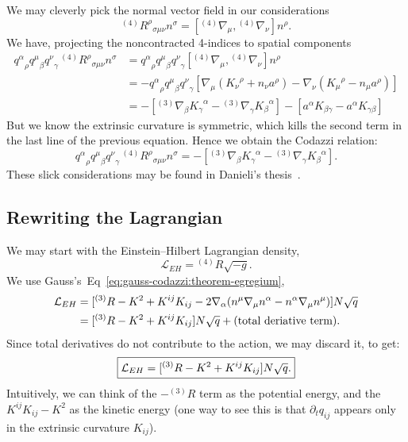 We may cleverly pick the normal vector field in our considerations
\begin{equation}
{}^{(4)}{R^{\rho}}_{\sigma\mu\nu}n^{\sigma}
  = [{}^{(4)}\nabla_{\mu}, {}^{(4)}\nabla_{\nu}]n^{\rho}.
\end{equation}
We have, projecting the noncontracted 4-indices to spatial components
\begin{subequations}
\begin{align}
{q^{\alpha}}_{\rho}{q^{\mu}}_{\beta}{q^{\nu}}_{\gamma}\,
  {}^{(4)}{R^{\rho}}_{\sigma\mu\nu}n^{\sigma}
&={q^{\alpha}}_{\rho}{q^{\mu}}_{\beta}{q^{\nu}}_{\gamma}[{}^{(4)}\nabla_{\mu}, {}^{(4)}\nabla_{\nu}]n^{\rho}\\
&=-{q^{\alpha}}_{\rho}{q^{\mu}}_{\beta}{q^{\nu}}_{\gamma}[\nabla_{\mu}({K_{\nu}}^{\rho}+n_{\nu}a^{\rho})-\nabla_{\nu}({K_{\mu}}^{\rho}-n_{\mu}a^{\rho})]\\
&=-[{}^{(3)}\nabla_{\beta}{K_{\gamma}}^{\alpha} - {}^{(3)}\nabla_{\gamma}{K_{\beta}}^{\alpha}]-[a^{\alpha}K_{\beta\gamma}-a^{\alpha}K_{\gamma\beta}]
\end{align}
\end{subequations}
But we know the extrinsic curvature is symmetric, which kills the second
term in the last line of the previous equation. Hence we obtain the
Codazzi relation:
\begin{equation}
\boxed{{q^{\alpha}}_{\rho}{q^{\mu}}_{\beta}{q^{\nu}}_{\gamma}\, {}^{(4)}{R^{\rho}}_{\sigma\mu\nu}n^{\sigma}
=-[{}^{(3)}\nabla_{\beta}{K_{\gamma}}^{\alpha} - {}^{(3)}\nabla_{\gamma}{K_{\beta}}^{\alpha}].}
\end{equation}
These slick considerations may be found in Danieli's thesis~\cite[see \S2.3]{danieli}.

\subsection{Rewriting the Lagrangian}

We may start with the Einstein--Hilbert Lagrangian density,
\begin{equation}
\mathcal{L}_{EH} = {}^{(4)}R\sqrt{-g}.
\end{equation}
We use Gauss's~Eq~\eqref{eq:gauss-codazzi:theorem-egregium},
\begin{equation}
  \begin{split}
\mathcal{L}_{EH} &= [{}^{(3)}R - K^{2} + K^{ij}K_{ij}-2\nabla_{\alpha}(n^{\mu}\nabla_{\mu}n^{\alpha}-n^{\alpha}\nabla_{\mu}n^{\mu})]N\sqrt{q}\\
&= [{}^{(3)}R - K^{2} + K^{ij}K_{ij}]N\sqrt{q}+(\mbox{total deriative term}).
\end{split}
\end{equation}
Since total derivatives do not contribute to the action, we may discard
it, to get:
\begin{equation}
\boxed{\mathcal{L}_{EH}= [{}^{(3)}R - K^{2} + K^{ij}K_{ij}]N\sqrt{q}.}
\end{equation}
Intuitively, we can think of the $-{}^{(3)}R$ term as the potential
energy, and the $K^{ij}K_{ij}-K^{2}$ as the kinetic energy (one way to
see this is that $\partial_{t}q_{ij}$ appears only in the extrinsic
curvature $K_{ij}$).

